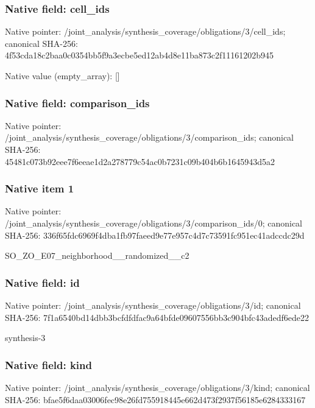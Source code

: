 \documentclass[10pt,a4paper]{article}
\begin{document}
\subsubsection{Native field: cell\_\allowbreak{}ids}
Native pointer: /joint\_\allowbreak{}analysis/synthesis\_\allowbreak{}coverage/obligations/3/cell\_\allowbreak{}ids; canonical SHA-256: 4f53cda18c2baa0c0354bb5f9a3ecbe5ed12ab4d8e11ba873c2f11161202b945

Native value (empty\_\allowbreak{}array): []

\subsubsection{Native field: comparison\_\allowbreak{}ids}
Native pointer: /joint\_\allowbreak{}analysis/synthesis\_\allowbreak{}coverage/obligations/3/comparison\_\allowbreak{}ids; canonical SHA-256: 45481c073b92eee7f6eeae1d2a278779c54ac0b7231c09b404b6b1645943d5a2

\subsubsection{Native item 1}
Native pointer: /joint\_\allowbreak{}analysis/synthesis\_\allowbreak{}coverage/obligations/3/comparison\_\allowbreak{}ids/0; canonical SHA-256: 336f65fdc6969f4dba1fb97faeed9e77e957c4d7c73591fc951ec41adccdc29d

\begingroup\raggedright\sloppy SO\_\allowbreak{}ZO\_\allowbreak{}E07\_\allowbreak{}neighborhood\_\allowbreak{}\_\allowbreak{}randomized\_\allowbreak{}\_\allowbreak{}c2\par\endgroup

\subsubsection{Native field: id}
Native pointer: /joint\_\allowbreak{}analysis/synthesis\_\allowbreak{}coverage/obligations/3/id; canonical SHA-256: 7f1a6540bd14dbb3bcfdfdfac9a64bfde09607556bb3c904bfc43adedf6ede22

\begingroup\raggedright\sloppy synthesis-3\par\endgroup

\subsubsection{Native field: kind}
Native pointer: /joint\_\allowbreak{}analysis/synthesis\_\allowbreak{}coverage/obligations/3/kind; canonical SHA-256: bfae5f6daa03006fec98e26fd755918445e662d473f2937f56185e6284333167
\end{document}
